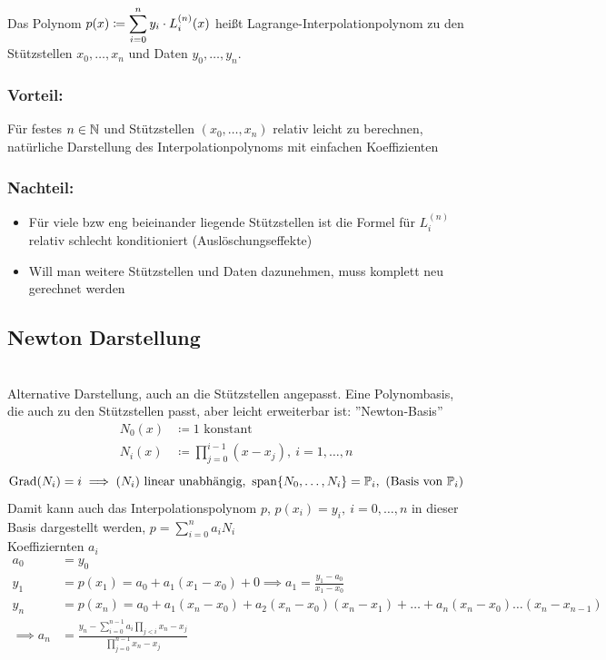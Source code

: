\begin{definition}
    Das Polynom $p(x)\coloneqq \displaystyle\sum_{i=0}^n y_i\cdot L_i^{(n)}(x)$ heißt Lagrange-Interpolationpolynom
    zu den Stützstellen $x_0,\dots,x_n$ und Daten $y_0,\dots,y_n$.
\end{definition}
\subsubsection*{Vorteil:}
Für festes $n\in \mathbb{N}$ und Stützstellen $(x_0,\dots, x_n)$ relativ leicht zu berechnen, natürliche Darstellung des 
Interpolationpolynoms mit einfachen Koeffizienten
\subsubsection*{Nachteil:}
\begin{itemize}
    \item Für viele bzw eng beieinander liegende Stützstellen ist die Formel für $L_i^{(n)}$ relativ schlecht konditioniert 
    (Auslöschungseffekte)
    \item Will man weitere Stützstellen und Daten dazunehmen, muss komplett neu gerechnet werden
\end{itemize}
\subsection{Newton Darstellung}\hfill\\
Alternative Darstellung, auch an die Stützstellen angepasst.
Eine Polynombasis, die auch zu den Stützstellen passt, aber leicht erweiterbar ist: ''Newton-Basis''
\begin{align*}
    N_0(x) &\coloneqq 1 \text{ konstant}\\
    N_i(x) &\coloneqq \displaystyle\prod_{j=0}^{i-1}(x-x_j), \ i=1,\dots,n
\end{align*}
\[
    \text{Grad}(N_i) = i \implies (N_i) \text{ linear unabhängig},\ \text{span\ensuremath{\left\{ N_0,\dots,N_i \right\}}} = \mathbb{P}_i, \text{ (Basis von }\mathbb{P}_i)
\]
Damit kann auch das Interpolationspolynom $p$, $p(x_i)=y_i, \ i=0,\dots,n$ in dieser Basis dargestellt werden, 
$p=\sum^n_{i=0}a_iN_i$\\
Koeffiziernten $a_i$
\begin{align*}
a_0&= y_0 &&\ \\
y_1&= p(x_1) =a_0+a_1(x_1-x_0)+0 \implies a_1=\frac{y_1-a_0}{x_1-x_0} \\
y_n&= p(x_n) =a_0+a_1(x_n-x_0)+a_2(x_n-x_0)(x_n-x_1)+\dots+ a_n(x_n-x_0)\dots(x_n-x_{n-1})\\ \implies a_n&= \frac{y_n-
\sum^{n-1}_{i=0}a_i\prod_{j<i}x_n-x_j}{\prod^{n-1}_{j=0}x_n-x_j} 
\end{align*}

